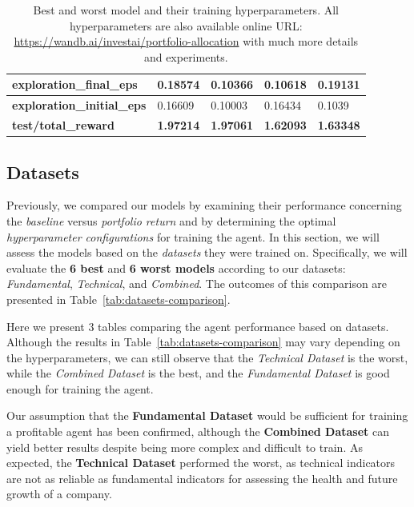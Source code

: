\documentclass[../xlapes02]{subfiles}
\begin{document}
\begin{table}[h!]
{\begin{tabular}{|l||l|l||l|l|}
                \textbf{exploration\_final\_eps}   & 0.18574                                      & 0.10366                                      & 0.10618                                      & 0.19131                                      \\ \hline
                \textbf{exploration\_initial\_eps} & 0.16609                                      & 0.10003                                      & 0.16434                                      & 0.1039                                       \\ \hline
                \textbf{test/total\_reward}        & \textcolor[RGB]{50,150,50}{\textbf{1.97214}} & \textcolor[RGB]{50,150,50}{\textbf{1.97061}} & \textcolor[RGB]{150,50,50}{\textbf{1.62093}} & \textcolor[RGB]{150,50,50}{\textbf{1.63348}} \\ \hline
            \end{tabular}
        }
        \caption{Best and worst model and their training hyperparameters. All hyperparameters are also available online URL: \url{https://wandb.ai/investai/portfolio-allocation} with much more details and experiments.}
        \label{tab:best-worst-hyperparameters}
    \end{table}

    \subsection{Datasets}\label{subsec:datasets}
    Previously, we compared our models by examining their performance concerning the \emph{baseline} versus \emph{portfolio return} and by determining the optimal \emph{hyperparameter configurations} for training the agent. In this section, we will assess the models based on the \emph{datasets} they were trained on. Specifically, we will evaluate the \textbf{6 best} and \textbf{6 worst models} according to our datasets: \emph{Fundamental}, \emph{Technical}, and \emph{Combined}. The outcomes of this comparison are presented in Table~\cref{tab:datasets-comparison}.

    Here we present 3 tables comparing the agent performance based on datasets. Although the results in Table~\cref{tab:datasets-comparison} may vary depending on the hyperparameters, we can still observe that the \emph{Technical Dataset} is the worst, while the \emph{Combined Dataset} is the best, and the \emph{Fundamental Dataset} is good enough for training the agent.

    Our assumption that the \textbf{Fundamental Dataset} would be sufficient for training a profitable agent has been confirmed, although the \textbf{Combined Dataset} can yield better results despite being more complex and difficult to train. As expected, the \textbf{Technical Dataset} performed the worst, as technical indicators are not as reliable as fundamental indicators for assessing the health and future growth of a company.
\end{document}
